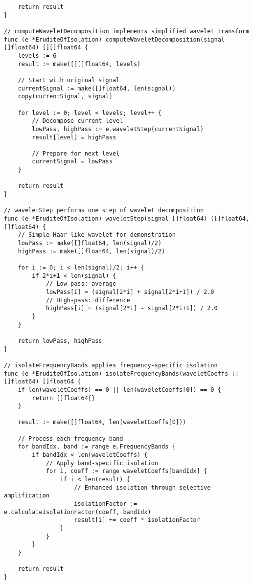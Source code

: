 \begin{tcolorbox}[colback=CodeBackground, colframe=DarkGray, title=Erudite of Isolation Implementation, fonttitle=\bfseries]
\begin{verbatim}
    return result
}

// computeWaveletDecomposition implements simplified wavelet transform
func (e *EruditeOfIsolation) computeWaveletDecomposition(signal []float64) [][]float64 {
    levels := 6
    result := make([][]float64, levels)
    
    // Start with original signal
    currentSignal := make([]float64, len(signal))
    copy(currentSignal, signal)
    
    for level := 0; level < levels; level++ {
        // Decompose current level
        lowPass, highPass := e.waveletStep(currentSignal)
        result[level] = highPass
        
        // Prepare for next level
        currentSignal = lowPass
    }
    
    return result
}

// waveletStep performs one step of wavelet decomposition
func (e *EruditeOfIsolation) waveletStep(signal []float64) ([]float64, []float64) {
    // Simple Haar-like wavelet for demonstration
    lowPass := make([]float64, len(signal)/2)
    highPass := make([]float64, len(signal)/2)
    
    for i := 0; i < len(signal)/2; i++ {
        if 2*i+1 < len(signal) {
            // Low-pass: average
            lowPass[i] = (signal[2*i] + signal[2*i+1]) / 2.0
            // High-pass: difference
            highPass[i] = (signal[2*i] - signal[2*i+1]) / 2.0
        }
    }
    
    return lowPass, highPass
}

// isolateFrequencyBands applies frequency-specific isolation
func (e *EruditeOfIsolation) isolateFrequencyBands(waveletCoeffs [][]float64) []float64 {
    if len(waveletCoeffs) == 0 || len(waveletCoeffs[0]) == 0 {
        return []float64{}
    }
    
    result := make([]float64, len(waveletCoeffs[0]))
    
    // Process each frequency band
    for bandIdx, band := range e.FrequencyBands {
        if bandIdx < len(waveletCoeffs) {
            // Apply band-specific isolation
            for i, coeff := range waveletCoeffs[bandIdx] {
                if i < len(result) {
                    // Enhanced isolation through selective amplification
                    isolationFactor := e.calculateIsolationFactor(coeff, bandIdx)
                    result[i] += coeff * isolationFactor
                }
            }
        }
    }
    
    return result
}


\end{verbatim}
\end{tcolorbox}
